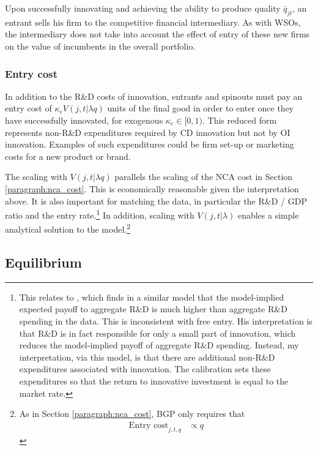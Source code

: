 \documentclass[11pt,english]{article}
\begin{document}
Upon successfully innovating and achieving the ability to produce quality $\bar{q}_{jt}$, an entrant sells his firm to the competitive financial intermediary. As with WSOs, the intermediary does not take into account the effect of entry of these new firms on the value of incumbents in the overall portfolio.

\subsubsection{Entry cost}

In addition to the R\&D costs of innovation, entrants and spinouts must pay an entry cost of $\kappa_{e} V(j,t|\lambda q)$ units of the final good in order to enter once they have successfully innovated, for exogenous $\kappa_e \in [0,1)$. This reduced form represents non-R\&D expenditures required by CD innovation but not by OI innovation. Examples of such expenditures could be firm set-up or marketing costs for a new product or brand.

The scaling with $V(j,t|\lambda q)$ parallels the scaling of the NCA cost in Section \ref{paragraph:nca_cost}. This is economically reasonable given the interpretation above. It is also important for matching the data, in particular the R\&D / GDP ratio and the entry rate.\footnote{This relates to \cite{comin_rd_2004}, which finds in a similar model that the model-implied expected payoff to aggregate R\&D is much higher than aggregate R\&D spending in the data. This is inconsistent with free entry. His interpretation is that R\&D is in fact responsible for only a small part of innovation, which reduces the model-implied payoff of aggregate R\&D spending. Instead, my interpretation, via this model, is that there are additional non-R\&D expenditures associated with innovation. The calibration sets these expenditures so that the return to innovative investment is equal to the market rate.} In addition, scaling with $V(j,t|\lambda)$ enables a simple analytical solution to the model.\footnote{As in Section \ref{paragraph:nca_cost}, BGP only requires that 
\begin{align*}
	\textrm{Entry cost}_{j,t,q} &\propto q
\end{align*}}

\subsection{Equilibrium}\label{subsec:decentralized_equilibrium}
\end{document}
